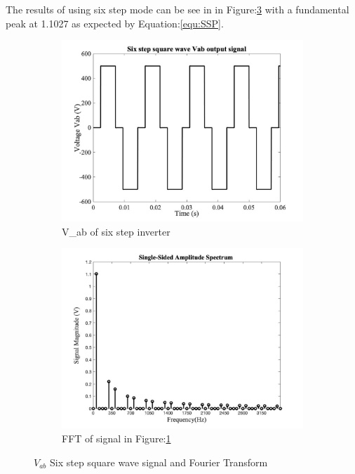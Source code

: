 \documentclass{article}
\begin{document}
The results of using six step mode can be see in in Figure:\ref{fig:fig1} with a fundamental peak at 1.1027 as expected by Equation:\ref{equ:SSP}.
\begin{figure}[H]
\begin{subfigure}{.5\textwidth}
  \centering
\includegraphics[scale=0.15]{one.jpg}
\caption{V_{ab} of six step inverter}
\label{fig:signalOne}
\end{subfigure}%
\begin{subfigure}{.5\textwidth}
  \centering
\includegraphics[scale=0.15]{two.jpg}
\caption{FFT of signal in Figure:\ref{fig:signalOne}}
\label{fig:fftOne}
\end{subfigure}
\caption{$V_{ab}$ Six step square wave signal and Fourier Transform}
\label{fig:fig1}
\end{figure}
\end{document}
